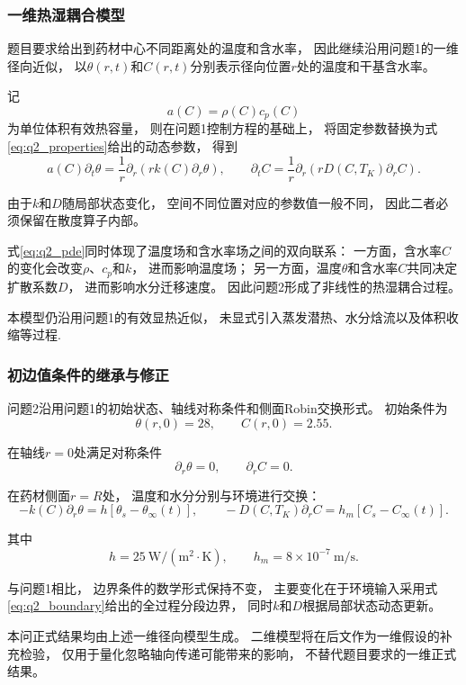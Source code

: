 \documentclass[withoutpreface]{cumcmthesis}
\begin{document}
\subsubsection{一维热湿耦合模型}

题目要求给出到药材中心不同距离处的温度和含水率，
因此继续沿用问题1的一维径向近似，
以$\theta(r,t)$和$C(r,t)$分别表示径向位置$r$处的温度和干基含水率。

记
\[
a(C)=\rho(C)c_p(C)
\]
为单位体积有效热容量，
则在问题1控制方程的基础上，
将固定参数替换为式\eqref{eq:q2_properties}给出的动态参数，
得到
\begin{equation}\label{eq:q2_pde}
a(C)\partial_t\theta
=
\frac1r
\partial_r
\left(
rk(C)\partial_r\theta
\right),
\qquad
\partial_tC
=
\frac1r
\partial_r
\left(
rD(C,T_K)\partial_rC
\right).
\end{equation}

由于$k$和$D$随局部状态变化，
空间不同位置对应的参数值一般不同，
因此二者必须保留在散度算子内部。

式\eqref{eq:q2_pde}同时体现了温度场和含水率场之间的双向联系：
一方面，含水率$C$的变化会改变$\rho$、$c_p$和$k$，
进而影响温度场；
另一方面，温度$\theta$和含水率$C$共同决定扩散系数$D$，
进而影响水分迁移速度。
因此问题2形成了非线性的热湿耦合过程。

本模型仍沿用问题1的有效显热近似，
未显式引入蒸发潜热、水分焓流以及体积收缩等过程.


\subsubsection{初边值条件的继承与修正}

问题2沿用问题1的初始状态、轴线对称条件和侧面Robin交换形式。
初始条件为
\[
\theta(r,0)=28,
\qquad
C(r,0)=2.55.
\]

在轴线$r=0$处满足对称条件
\[
\partial_r\theta=0,
\qquad
\partial_rC=0.
\]

在药材侧面$r=R$处，
温度和水分分别与环境进行交换：
\begin{equation}\label{eq:q2_robin}
-k(C)\partial_r\theta
=
h[\theta_s-\theta_\infty(t)],
\qquad
-D(C,T_K)\partial_rC
=
h_m[C_s-C_\infty(t)].
\end{equation}

其中
\[
h=25\ \mathrm{W/(m^2\cdot K)},
\qquad
h_m=8\times10^{-7}\ \mathrm{m/s}.
\]

与问题1相比，
边界条件的数学形式保持不变，
主要变化在于环境输入采用式\eqref{eq:q2_boundary}给出的全过程分段边界，
同时$k$和$D$根据局部状态动态更新。

本问正式结果均由上述一维径向模型生成。
二维模型将在后文作为一维假设的补充检验，
仅用于量化忽略轴向传递可能带来的影响，
不替代题目要求的一维正式结果。
\end{document}
